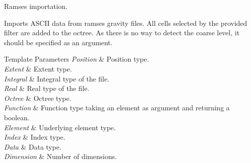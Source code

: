 Ramses importation. 

Imports A\-S\-C\-I\-I data from ramses gravity files. All cells selected by the provided filter are added to the octree. As there is no way to detect the coarse level, it should be specified as an argument. 
\begin{DoxyTemplParams}{Template Parameters}
{\em Position} & Position type. \\
\hline
{\em Extent} & Extent type. \\
\hline
{\em Integral} & Integral type of the file. \\
\hline
{\em Real} & Real type of the file. \\
\hline
{\em Octree} & Octree type. \\
\hline
{\em Function} & Function type taking an element as argument and returning a boolean. \\
\hline
{\em Element} & Underlying element type. \\
\hline
{\em Index} & Index type. \\
\hline
{\em Data} & Data type. \\
\hline
{\em Dimension} & Number of dimensions. \\
\hline
\end{DoxyTemplParams}

